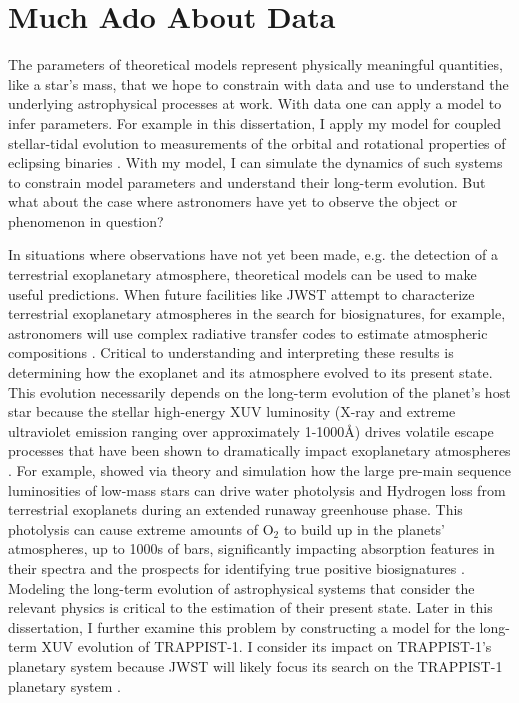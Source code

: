 \section{Much Ado About Data}

The parameters of theoretical models represent physically meaningful quantities, like a star's mass, that we hope to constrain with data and use to understand the underlying astrophysical processes at work. With data one can apply a model to infer parameters. For example in this dissertation, I apply my model for coupled stellar-tidal evolution to measurements of the orbital and rotational properties of \kepler eclipsing binaries \citep[e.g.][]{McQuillan2014,Lurie2017}. With my model, I can simulate the dynamics of such systems to constrain model parameters and understand their long-term evolution. But what about the case where astronomers have yet to observe the object or phenomenon in question?

In situations where observations have not yet been made, e.g. the detection of a terrestrial exoplanetary atmosphere, theoretical models can be used to make useful predictions.  When future facilities like JWST attempt to characterize terrestrial exoplanetary atmospheres in the search for biosignatures, for example, astronomers will use complex radiative transfer codes to estimate atmospheric compositions \citep[e.g. SMART;][]{Meadows1996,Crisp1997}. Critical to understanding and interpreting these results is determining how the exoplanet and its atmosphere evolved to its present state. This evolution necessarily depends on the long-term evolution of the planet's host star because the stellar high-energy XUV luminosity (X-ray and extreme ultraviolet emission ranging over approximately 1-1000\AA) drives volatile escape processes that have been shown to dramatically impact exoplanetary atmospheres \citep{Watson1981,Lammer2003,MurrayClay2009}. For example, \citet{Luger2015} showed via theory and simulation how the large pre-main sequence luminosities of low-mass stars can drive water photolysis and Hydrogen loss from terrestrial exoplanets during an extended runaway greenhouse phase. This photolysis can cause extreme amounts of O$_2$ to build up in the planets' atmospheres, up to 1000s of bars, significantly impacting absorption features in their spectra and the prospects for identifying true positive biosignatures \citep[see][]{Meadows2017,Meadows2018}. Modeling the long-term evolution of astrophysical systems that consider the relevant physics is critical to the estimation of their present state. Later in this dissertation, I further examine this problem by constructing a model for the long-term XUV evolution of TRAPPIST-1. I consider its impact on TRAPPIST-1's planetary system because JWST will likely focus its search on the TRAPPIST-1 planetary system \citep{Morley2017,Lincowski2018,Lustig2019}. 

